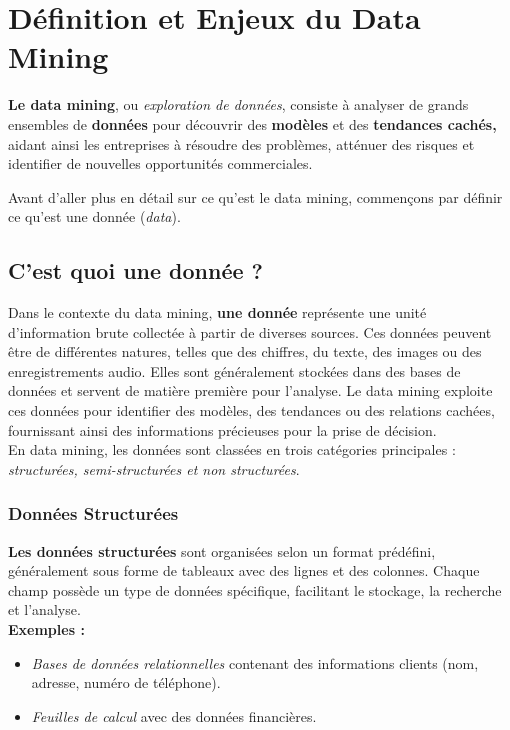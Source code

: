 \documentclass[a4paper,12pt]{article}
\begin{document}
\section{Définition et Enjeux du Data Mining}
\textbf{Le data mining}, ou \textit{exploration de données}, consiste à analyser de grands ensembles de \textbf{données} pour découvrir des \textbf{modèles} et des \textbf{tendances cachés,} aidant ainsi les entreprises à résoudre des problèmes, atténuer des risques et identifier de nouvelles opportunités commerciales.

Avant d’aller plus en détail sur ce qu’est le data mining, commençons par définir ce qu’est une donnée (\textit{data}). \\


    \subsection{C'est quoi une donnée ?}
        Dans le contexte du data mining, \textbf{une donnée} représente une unité d'information brute collectée à partir de diverses sources. Ces données peuvent être de différentes natures, telles que des chiffres, du texte, des images ou des enregistrements audio. Elles sont généralement stockées dans des bases de données et servent de matière première pour l'analyse. Le data mining exploite ces données pour identifier des modèles, des tendances ou des relations cachées, fournissant ainsi des informations précieuses pour la prise de décision.\\

        En data mining, les données sont classées en trois catégories principales : \textit{structurées, semi-structurées et non structurées}. \\

        \subsubsection{Données Structurées}
            \textbf{Les données structurées} sont organisées selon un format prédéfini, généralement sous forme de tableaux avec des lignes et des colonnes. Chaque champ possède un type de données spécifique, facilitant le stockage, la recherche et l'analyse.\\

            \textbf{Exemples :}
            \begin{itemize}
                \item \textit{Bases de données relationnelles} contenant des informations clients (nom, adresse, numéro de téléphone).
                \item \textit{Feuilles de calcul} avec des données financières.
            \end{itemize}
            
\end{document}
